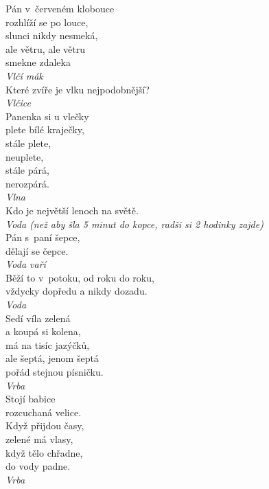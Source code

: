 \begin{multicols}{4}
\noindent
Pán v~červeném klobouce\\
rozhlíží se po louce,\\
slunci nikdy nesmeká,\\
ale větru, ale větru\\
smekne zdaleka\\[1 mm]
{\sl Vlčí mák}\\

\noindent
Které zvíře je vlku nejpodobnější?\\[1 mm]
{\sl Vlčice}\\

\noindent
Panenka si u vlečky\\
plete bílé kraječky,\\
stále plete,\\
neuplete,\\
stále párá,\\
nerozpárá.\\[1 mm]
{\sl Vlna}\\

\noindent
Kdo je největší lenoch na světě.\\[1 mm]
{\sl Voda (než aby šla 5 minut do kopce, radši si 2 hodinky zajde)}\\

\noindent
Pán s~paní šepce,\\
dělají se čepce.\\[1 mm]
{\sl Voda vaří}\\

\noindent
Běží to v~potoku, od roku do roku,\\
vždycky dopředu a nikdy dozadu.\\[1 mm]
{\sl Voda}\\

\noindent
Sedí víla zelená\\
a koupá si kolena,\\
má na tisíc jazýčků,\\
ale šeptá, jenom šeptá\\
pořád stejnou písničku.\\[1 mm]
{\sl Vrba}\\

\noindent
Stojí babice\\
rozcuchaná velice.\\
Když přijdou časy,\\
zelené má vlasy,\\
když tělo chřadne,\\
do vody padne.\\[1 mm]
{\sl Vrba}\\


\end{multicols}
